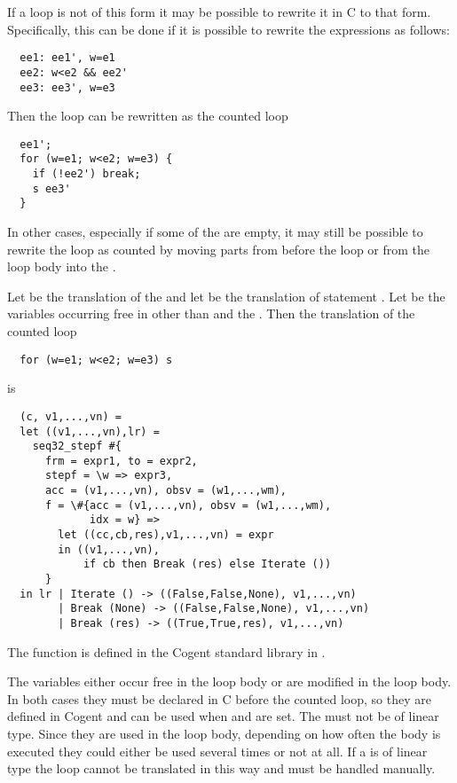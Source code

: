 If a  loop is not of this form it may be possible to rewrite it in C to that form. Specifically, this can be done 
if it is possible to rewrite the expressions  as follows:
\begin{verbatim}
  ee1: ee1', w=e1
  ee2: w<e2 && ee2'
  ee3: ee3', w=e3
\end{verbatim}
Then the loop  can be rewritten as the counted loop
\begin{verbatim}
  ee1';
  for (w=e1; w<e2; w=e3) {
    if (!ee2') break;
    s ee3'
  }
\end{verbatim}
In other cases, especially if some of the  are empty, it may still be possible to rewrite the loop as counted by
moving parts from before the loop or from the loop body into the .

Let  be the translation of the  and let  be the translation of 
statement . Let  be the variables occurring free in  other than  and the .
Then the translation of the counted loop 
\begin{verbatim}
  for (w=e1; w<e2; w=e3) s
\end{verbatim}
is
\begin{verbatim}
  (c, v1,...,vn) = 
  let ((v1,...,vn),lr) = 
    seq32_stepf #{
      frm = expr1, to = expr2, 
      stepf = \w => expr3, 
      acc = (v1,...,vn), obsv = (w1,...,wm), 
      f = \#{acc = (v1,...,vn), obsv = (w1,...,wm), 
             idx = w} => 
        let ((cc,cb,res),v1,...,vn) = expr
        in ((v1,...,vn),
            if cb then Break (res) else Iterate ())
      }
  in lr | Iterate () -> ((False,False,None), v1,...,vn)
        | Break (None) -> ((False,False,None), v1,...,vn)
        | Break (res) -> ((True,True,res), v1,...,vn)
\end{verbatim}

The function  is defined in the Cogent standard library in .

The variables  either occur free in the loop body or are modified in the loop body.
In both cases they must be declared in C before the counted loop, so they are defined in Cogent and can be used
when  and  are set. The  must not be of linear type. Since they are used
in the loop body, depending on how often the body is executed they could either be used several times or not at all.
If a  is of linear type the loop cannot be translated in this way and must be handled manually.

